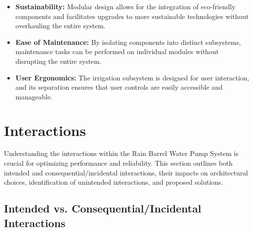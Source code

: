 \documentclass[12pt]{report}
\begin{document}
\begin{itemize}
    \item \textbf{Sustainability:} Modular design allows for the integration of eco-friendly components and facilitates upgrades to more sustainable technologies without overhauling the entire system.
    \item \textbf{Ease of Maintenance:} By isolating components into distinct subsystems, maintenance tasks can be performed on individual modules without disrupting the entire system.
    \item \textbf{User Ergonomics:} The irrigation subsystem is designed for user interaction, and its separation ensures that user controls are easily accessible and manageable.
\end{itemize}


\section{Interactions}
\label{sec:interactions}

Understanding the interactions within the Rain Barrel Water Pump System is crucial for optimizing performance and reliability. This section outlines both intended and consequential/incidental interactions, their impacts on architectural choices, identification of unintended interactions, and proposed solutions.

\subsection{Intended vs. Consequential/Incidental Interactions}
\end{document}
